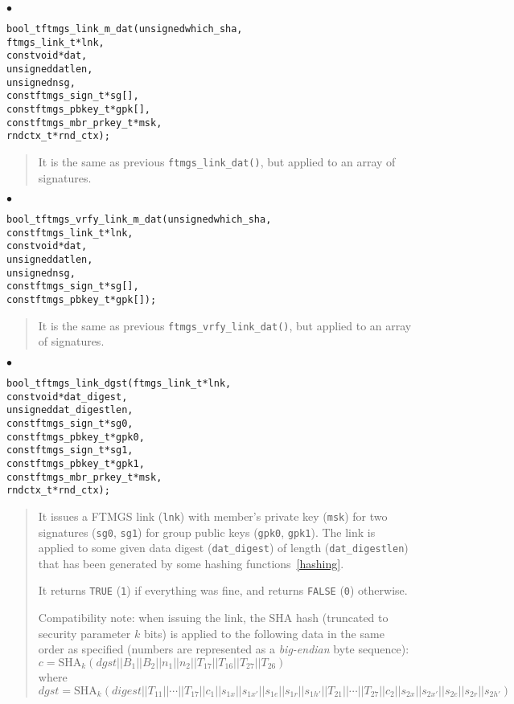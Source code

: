 \documentclass[a4paper]{article}
\newenvironment{api}%
{\noindent$\bullet$\hfill\begin{minipage}[t]{0.97\linewidth}\footnotesize\begin{alltt}}%
{\end{alltt}\end{minipage}}%
\begin{document}
\begin{api}
bool_t ftmgs_link_m_dat(unsigned which_sha,
                        ftmgs_link_t* lnk,
                        const void* dat,
                        unsigned datlen,
                        unsigned nsg,
                        const ftmgs_sign_t* sg[],
                        const ftmgs_pbkey_t* gpk[],
                        const ftmgs_mbr_prkey_t* msk,
                        rndctx_t* rnd_ctx);
\end{api}
\begin{quote}\footnotesize
It is the same as previous \verb|ftmgs_link_dat()|, but applied to an
array of signatures.
\end{quote}
\begin{api}
bool_t ftmgs_vrfy_link_m_dat(unsigned which_sha,
                             const ftmgs_link_t* lnk,
                             const void* dat,
                             unsigned datlen,
                             unsigned nsg,
                             const ftmgs_sign_t* sg[],
                             const ftmgs_pbkey_t* gpk[]);
\end{api}
\begin{quote}\footnotesize
It is the same as previous \verb|ftmgs_vrfy_link_dat()|, but applied to an
array of signatures.
\end{quote}
\begin{api}
bool_t ftmgs_link_dgst(ftmgs_link_t* lnk,
                       const void* dat_digest,
                       unsigned dat_digestlen,
                       const ftmgs_sign_t* sg0,
                       const ftmgs_pbkey_t* gpk0,
                       const ftmgs_sign_t* sg1,
                       const ftmgs_pbkey_t* gpk1,
                       const ftmgs_mbr_prkey_t* msk,
                       rndctx_t* rnd_ctx);
\end{api}
\begin{quote}\footnotesize
It issues a FTMGS link (\verb|lnk|) with member's private key
(\verb|msk|) for two signatures (\verb|sg0|, \verb|sg1|) for group
public keys (\verb|gpk0|, \verb|gpk1|). The link is applied to some
given data digest (\verb|dat_digest|) of length (\verb|dat_digestlen|)
that has been generated by some hashing functions~\ref{hashing}.

It returns \verb|TRUE| (\verb|1|) if everything was fine, and returns
\verb|FALSE| (\verb|0|) otherwise.

Compatibility note: when issuing the link, the SHA hash
(truncated to security parameter $k$ bits) is applied to the following
data in the same order as specified (numbers are represented as a
\emph{big-endian} byte sequence):\\ {$c =
  \mathrm{SHA}_k(\mathit{dgst}||B_1||B_2||n_1||n_2||T_{17}||T_{16}||T_{27}||T_{26})$}
\\ where 
$\mathit{dgst} = \mathrm{SHA}_k(\mathit{digest}||T_{11}||\cdots||T_{17}||c_1||s_{1x}||s_{1x'}||s_{1e}||s_{1r}||s_{1h'}||T_{21}||\cdots||T_{27}||c_2||s_{2x}||s_{2x'}||s_{2e}||s_{2r}||s_{2h'})$
\end{quote}
\end{document}
